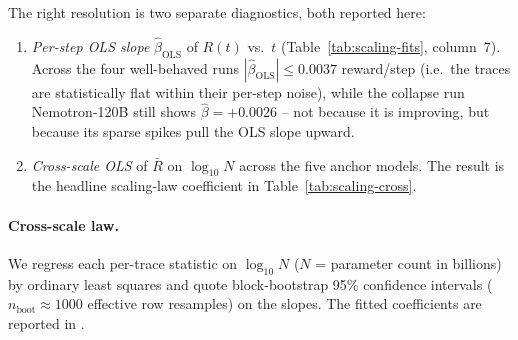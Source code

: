 The right resolution is two separate diagnostics, both reported
here:

\begin{enumerate}
  \item \emph{Per-step OLS slope} $\hat\beta_{\text{OLS}}$ of
    $R(t)$ vs.~$t$ (Table~\ref{tab:scaling-fits}, column~7).
    Across the four well-behaved runs
    $|\hat\beta_{\text{OLS}}| \le 0.0037$ reward/step (i.e.\ the
    traces are statistically flat within their per-step noise),
    while the collapse run Nemotron-120B still shows $\hat\beta
    = +0.0026$ -- not because it is improving, but because its
    sparse spikes pull the OLS slope upward.
  \item \emph{Cross-scale OLS} of $\bar R$ on $\log_{10} N$
    across the five anchor models.  The result is the headline
    scaling-law coefficient in
    Table~\ref{tab:scaling-cross}.
\end{enumerate}

\paragraph{Cross-scale law.}
\label{par:cross-scale}
We regress each per-trace statistic on $\log_{10} N$
(\(N\) = parameter count in billions) by ordinary least squares and
quote block-bootstrap 95\% confidence intervals
($n_{\text{boot}} \approx 1000$ effective row resamples) on
the slopes.  The fitted coefficients are reported in
.


